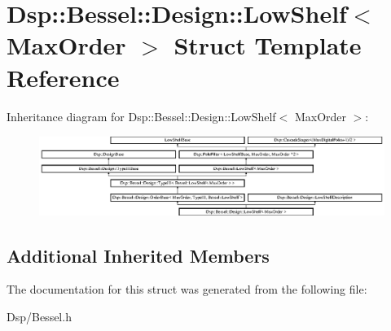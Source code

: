 \hypertarget{structDsp_1_1Bessel_1_1Design_1_1LowShelf}{\section{Dsp\-:\-:Bessel\-:\-:Design\-:\-:Low\-Shelf$<$ Max\-Order $>$ Struct Template Reference}
\label{structDsp_1_1Bessel_1_1Design_1_1LowShelf}
}
Inheritance diagram for Dsp\-:\-:Bessel\-:\-:Design\-:\-:Low\-Shelf$<$ Max\-Order $>$\-:\begin{figure}[H]
\begin{center}
\leavevmode
\includegraphics[height=2.604651cm]{structDsp_1_1Bessel_1_1Design_1_1LowShelf}
\end{center}
\end{figure}
\subsection*{Additional Inherited Members}


The documentation for this struct was generated from the following file\-:\begin{DoxyCompactItemize}
\item 
Dsp/Bessel.\-h\end{DoxyCompactItemize}
